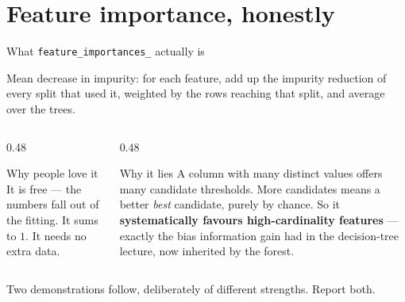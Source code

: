 \documentclass[aspectratio=169]{beamer}
\begin{document}
\section[Importance]{Feature importance, honestly}
\label{sec:imp}

\begin{frame}[shrink=4]{What \texttt{feature\_importances\_} actually is}
  \begin{exampleblock}{}
    \centering
    Mean decrease in impurity: for each feature, add up the impurity
    reduction of every split that used it, weighted by the rows reaching that
    split, and average over the trees.
  \end{exampleblock}
  \begin{columns}[T]
    \begin{column}{0.48\textwidth}
      \begin{block}{Why people love it}
        It is free --- the numbers fall out of the fitting. It sums to $1$. It
        needs no extra data.
      \end{block}
    \end{column}
    \begin{column}{0.48\textwidth}
      \begin{alertblock}{Why it lies}
        A column with many distinct values offers many candidate thresholds.
        More candidates means a better \emph{best} candidate, purely by
        chance. So it \textbf{systematically favours high-cardinality
        features} --- exactly the bias information gain had in the
        decision-tree lecture, now inherited by the forest.
      \end{alertblock}
    \end{column}
  \end{columns}
  \begin{center}\small
    Two demonstrations follow, deliberately of different strengths. Report
    both.
  \end{center}
\end{frame}
\end{document}

